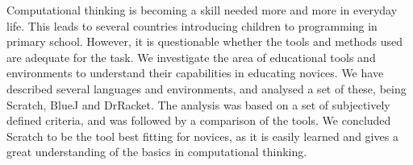 Computational thinking is becoming a skill needed more and more in everyday life. This leads to several countries introducing children to programming in primary school. However, it is questionable whether the tools and methods used are adequate for the task. We investigate the area of educational tools and environments to understand their capabilities in educating novices. We have described several languages and environments, and analysed a set of these, being Scratch, BlueJ and DrRacket. The analysis was based on a set of subjectively defined criteria, and was followed by a comparison of the tools. We concluded Scratch to be the tool best fitting for novices, as it is easily learned and gives a great understanding of the basics in computational thinking.